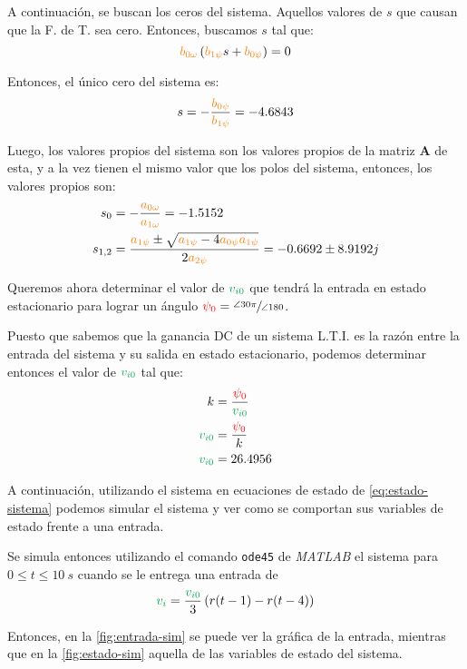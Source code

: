 A continuación, se buscan los ceros del sistema. Aquellos valores de $s$
que causan que la F. de T. sea cero. Entonces, buscamos $s$ tal que:
\begin{equation}
  \nara{\nara{b_{0\omega}}}\left(\nara{b_{1\psi}}s + \nara{b_{0\psi}}\right) = 0
\end{equation}

Entonces, el único cero del sistema es:
\begin{equation}
  s = -\frac{\nara{b_{0\psi}}}{\nara{b_{1\psi}}} = -4.6843
\end{equation}

Luego, los valores propios del sistema son los valores propios de la matriz
$\pmb{A}$ de esta, y a la vez tienen el mismo valor que los polos del
sistema, entonces, los valores propios son:
\begin{align}
  s_{0} &= -\frac{\nara{a_{0\omega}}}{\nara{a_{1\omega}}} = -1.5152 \\
  s_{1,2} &= \frac{\nara{a_{1\psi}} \pm \sqrt{\nara{a_{1\psi}} - 4 \nara{a_{0\psi}a_{1\psi}}}}{2\nara{a_{2\psi}}} = -0.6692 \pm 8.9192j
\end{align}

Queremos ahora determinar el valor de $\verd{v_{i0}}$ que tendrá la
entrada en estado estacionario para lograr un ángulo $\mathbin{\color{red}\psi_{0}} = \sfrac{\angle{30}\pi}{\angle{180}}$.

Puesto que sabemos que la ganancia DC de un sistema L.T.I. es la razón entre la
entrada del sistema y su salida en estado estacionario, podemos determinar
entonces el valor de $\verd{v_{i0}}$ tal que:
\begin{align}
  k &= \frac{\rojo{\psi_{0}}}{\verd{v_{i0}}} \\
  \verd{v_{i0}} &= \frac{\rojo{\psi_{0}}}{k} \\
  \verd{v_{i0}} &= 26.4956
\end{align}

A continuación, utilizando el sistema en ecuaciones de estado de \eqref{eq:estado-sistema}
podemos simular el sistema y ver como se comportan sus variables de estado frente
a una entrada.

Se simula entonces utilizando el comando \texttt{ode45} de \textit{MATLAB} el
sistema para $0 \leq t \leq 10\ \unit{s}$ cuando se le entrega una entrada de
\begin{equation}
  \verd{v_{i}} = \frac{\verd{v_{i0}}}{3}\left(r(t-1) - r(t-4)\right)
\end{equation}

Entonces, en la \autoref{fig:entrada-sim} se puede ver la gráfica de la entrada,
mientras que en la \autoref{fig:estado-sim} aquella de las variables de estado
del sistema.

